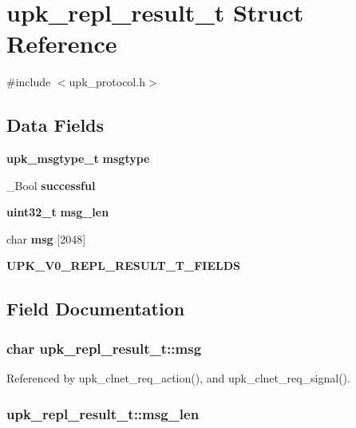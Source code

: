 \section{upk\_\-repl\_\-result\_\-t Struct Reference}
\label{structupk__repl__result__t}


{\ttfamily \#include $<$upk\_\-protocol.h$>$}

\subsection*{Data Fields}
\begin{DoxyCompactItemize}
\item 
{\bf upk\_\-msgtype\_\-t} {\bf msgtype}
\item 
\_\-Bool {\bf successful}
\item 
{\bf uint32\_\-t} {\bf msg\_\-len}
\item 
char {\bf msg} [2048]
\item 
{\bf UPK\_\-V0\_\-REPL\_\-RESULT\_\-T\_\-FIELDS}
\end{DoxyCompactItemize}


\subsection{Field Documentation}
\subsubsection[{msg}]{\setlength{\rightskip}{0pt plus 5cm}char {\bf upk\_\-repl\_\-result\_\-t::msg}}\label{structupk__repl__result__t_ae61826685cf4069806dc62d58e595a48}


Referenced by upk\_\-clnet\_\-req\_\-action(), and upk\_\-clnet\_\-req\_\-signal().

\subsubsection[{msg\_\-len}]{ {\bf upk\_\-repl\_\-result\_\-t::msg\_\-len}}\label{structupk__repl__result__t_ae5d99bcf7d017dbf06a3cafd89d57dbb}
